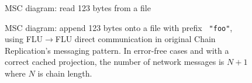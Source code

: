 \documentclass[preprint,10pt]{sigplanconf}
\begin{document}
\begin{figure}[tp]
\caption{MSC diagram: read 123 bytes from a file}
\label{fig:read-flowMSC}
\end{figure}

\begin{figure}[tp]
\caption{MSC diagram: append 123 bytes onto a file with prefix {\tt
    "foo"}, using FLU$\rightarrow$FLU direct communication in original
  Chain Replication's messaging pattern.  In error-free cases and with
  a correct cached projection, the number of network messages is $N+1$
  where $N$ is chain length.}
\label{fig:append-flow2MSC}
\end{figure}
\end{document}
